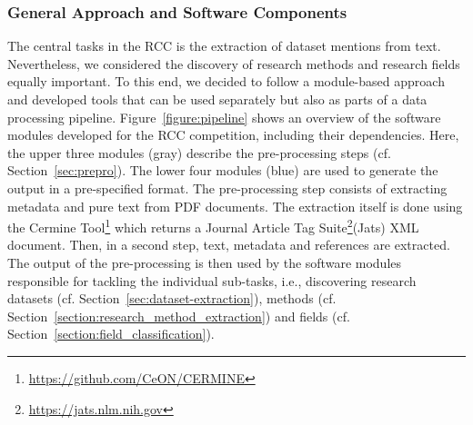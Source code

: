 \subsubsection{General Approach and Software Components}
The central tasks in the RCC is the extraction of dataset mentions from text. 
Nevertheless, we considered the discovery of research methods and research fields equally important.
To this end, we decided to follow a module-based approach and developed tools that can be used separately but also as parts of a data processing pipeline.
Figure~\ref{figure:pipeline} shows an overview of the software modules developed for the RCC competition, including their dependencies. Here, the upper three modules (gray) describe the pre-processing steps (cf. Section~\ref{sec:prepro}).
The lower four modules (blue) are used to generate the output in a pre-specified format. 
The pre-processing step consists of extracting metadata and pure text from PDF documents. The extraction itself is done using the Cermine Tool\footnote{\url{https://github.com/CeON/CERMINE}} which returns a Journal Article Tag Suite\footnote{\url{https://jats.nlm.nih.gov}}(Jats) XML document. Then, in a second step,
text, metadata and references are extracted. The output of the pre-processing is then used by the software modules responsible for tackling the individual sub-tasks, i.e., discovering research datasets (cf. Section~\ref{sec:dataset-extraction}), methods (cf. Section~\ref{section:research_method_extraction}) and fields (cf. Section~\ref{section:field_classification}).






